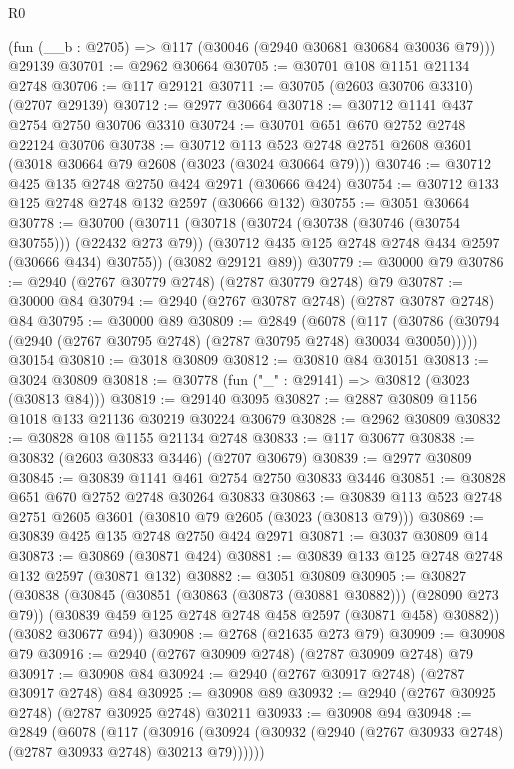 \begin{lexlean}{R0}
\begin{coremodule}
    (fun (__b : @2705) => @117 (@30046 (@2940 @30681 @30684 @30036 @79)))
    @29139
@30701 := @2962 @30664
@30705 := @30701 @108 @1151 @21134 @2748
@30706 := @117 @29121
@30711 := @30705 (@2603 @30706 @3310) (@2707 @29139)
@30712 := @2977 @30664
@30718 := @30712 @1141 @437 @2754 @2750 @30706 @3310
@30724 := @30701 @651 @670 @2752 @2748 @22124 @30706
@30738 := @30712
    @113
    @523
    @2748
    @2751
    @2608
    @3601
    (@3018 @30664 @79 @2608 (@3023 (@3024 @30664 @79)))
@30746 := @30712 @425 @135 @2748 @2750 @424 @2971 (@30666 @424)
@30754 := @30712 @133 @125 @2748 @2748 @132 @2597 (@30666 @132)
@30755 := @3051 @30664
@30778 := @30700
    (@30711
      (@30718
        (@30724 (@30738 (@30746 (@30754 @30755))) (@22432 @273 @79))
        (@30712 @435 @125 @2748 @2748 @434 @2597 (@30666 @434) @30755))
      (@3082 @29121 @89))
@30779 := @30000 @79
@30786 := @2940 (@2767 @30779 @2748) (@2787 @30779 @2748) @79
@30787 := @30000 @84
@30794 := @2940 (@2767 @30787 @2748) (@2787 @30787 @2748) @84
@30795 := @30000 @89
@30809 := @2849
    (@6078 (@117 (@30786 (@30794 (@2940 (@2767 @30795 @2748) (@2787 @30795 @2748) @30034 @30050)))))
    @30154
@30810 := @3018 @30809
@30812 := @30810 @84 @30151
@30813 := @3024 @30809
@30818 := @30778 (fun ("_" : @29141) => @30812 (@3023 (@30813 @84)))
@30819 := @29140 @3095
@30827 := @2887 @30809 @1156 @1018 @133 @21136 @30219 @30224 @30679
@30828 := @2962 @30809
@30832 := @30828 @108 @1155 @21134 @2748
@30833 := @117 @30677
@30838 := @30832 (@2603 @30833 @3446) (@2707 @30679)
@30839 := @2977 @30809
@30845 := @30839 @1141 @461 @2754 @2750 @30833 @3446
@30851 := @30828 @651 @670 @2752 @2748 @30264 @30833
@30863 := @30839 @113 @523 @2748 @2751 @2605 @3601 (@30810 @79 @2605 (@3023 (@30813 @79)))
@30869 := @30839 @425 @135 @2748 @2750 @424 @2971
@30871 := @3037 @30809 @14
@30873 := @30869 (@30871 @424)
@30881 := @30839 @133 @125 @2748 @2748 @132 @2597 (@30871 @132)
@30882 := @3051 @30809
@30905 := @30827
    (@30838
      (@30845
        (@30851 (@30863 (@30873 (@30881 @30882))) (@28090 @273 @79))
        (@30839 @459 @125 @2748 @2748 @458 @2597 (@30871 @458) @30882))
      (@3082 @30677 @94))
@30908 := @2768 (@21635 @273 @79)
@30909 := @30908 @79
@30916 := @2940 (@2767 @30909 @2748) (@2787 @30909 @2748) @79
@30917 := @30908 @84
@30924 := @2940 (@2767 @30917 @2748) (@2787 @30917 @2748) @84
@30925 := @30908 @89
@30932 := @2940 (@2767 @30925 @2748) (@2787 @30925 @2748) @30211
@30933 := @30908 @94
@30948 := @2849
    (@6078
      (@117
        (@30916 (@30924 (@30932 (@2940 (@2767 @30933 @2748) (@2787 @30933 @2748) @30213 @79))))))

\end{coremodule}
\end{lexlean}
